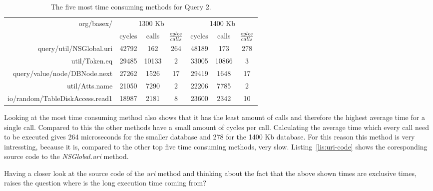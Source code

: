\begin {table}[htpb] 
  \begin{center}
\hspace*{-0.5cm}
\begin {tabular} {|r|r|c|c|r|c|c|}
  	\hline
	\multirow{2}{*}{org/basex/}&\multicolumn{3}{c}{1300 Kb}&\multicolumn{3}{|c|}{1400 Kb}\\
	\cline{2-7}
	&cycles&calls&${cylce \over calls}$&cycles&calls&${cylce \over calls}$\\
	\hline
	\hline
	query/util/NSGlobal.uri&42792&162&264&48189&173&278\\
	\hline
	util/Token.eq&29485&10133&2&33005&10866&3\\
	\hline
	query/value/node/DBNode.next&27262&1526&17&29419&1648&17\\
	\hline
	util/Atts.name&21050&7290&2&22206&7785&2\\
	\hline
	io/random/TableDiskAccess.read1&18987&2181&8&23600&2342&10\\
	\hline
\end {tabular}
\caption {The five most time consuming methods for Query 2.}
\label {tab:traceview-q2-methods}
\end{center}
\end {table}
Looking at the most time consuming method also shows that it has the least amount of calls and therefore the highest average time for a single call.
Compared to this the other methods have a small amount of cycles per call.
Calculating the average time which every call need to be executed gives 264 microseconds for the smaller database and 278 for the 1400 Kb database.
For this reason this method is very intressting, because it is, compared to the other top five time consuming methods, very slow.
Listing~\ref{lis:uri-code} shows the coresponding source code to the \textit{NSGlobal.uri} method.
		
Having a closer look at the source code of the \textit{uri} method and thinking about the fact that the above shown times are exclusive times, raises the question where is the long execution time coming from?






